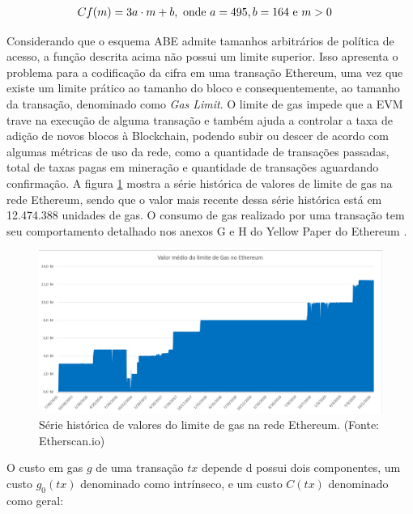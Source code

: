 \documentclass[a4paper,11pt]{article}
\begin{document}
\begin{equation}
  \begin{aligned}
    Cf(m) & =  3 a \cdot m + b, \textnormal{ onde } a = 495, b = 164 \textnormal{ e } m > 0
  \end{aligned}
\end{equation}

Considerando que o esquema ABE admite tamanhos arbitrários de política de acesso, a função descrita acima não possui um limite superior.
Isso apresenta o problema para a codificação da cifra em uma transação Ethereum, uma vez que existe um limite prático ao tamanho do bloco e consequentemente, ao tamanho da transação, denominado como \emph{Gas Limit}.
O limite de gas impede que a EVM trave na execução de alguma transação e também ajuda a controlar a taxa de adição de novos blocos à Blockchain, podendo subir ou descer de acordo com algumas métricas de uso da rede, como a quantidade de transações passadas, total de taxas pagas em mineração e quantidade de transações aguardando confirmação.
A figura \ref{fig:serie-gasLimit} mostra a série histórica de valores de limite de gas na rede Ethereum, sendo que o valor mais recente dessa série histórica está em 12.474.388 unidades de gas.
O consumo de gas realizado por uma transação tem seu comportamento detalhado nos anexos G e H do Yellow Paper do Ethereum \cite{Wood2017}.

\begin{figure}[!h]
  \centering
  \includegraphics[width=\textwidth]{images/gasLimit.png}
  \caption{Série histórica de valores do limite de gas na rede Ethereum. (Fonte: Etherscan.io)}
  \label{fig:serie-gasLimit}
\end{figure}

O custo em gas $g$ de uma transação $tx$ depende d possui dois componentes, um custo $g_{0}(tx)$ denominado como intrínseco, e um custo $C(tx)$ denominado como geral:
\end{document}
